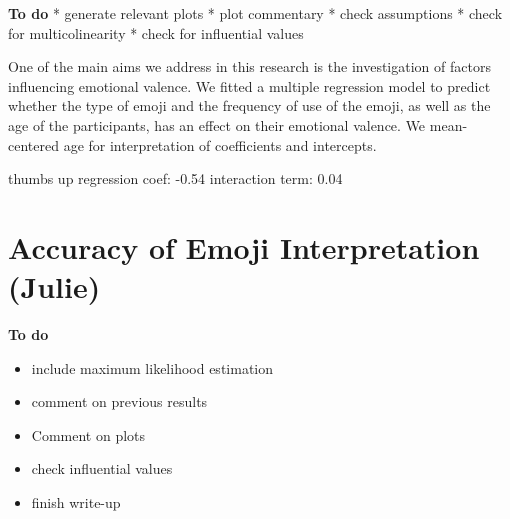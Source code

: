 \documentclass[
]{article}
\providecommand{\tightlist}{%
  \setlength{\itemsep}{0pt}\setlength{\parskip}{0pt}}
\begin{document}
\textbf{To do}
* generate relevant plots
* plot commentary
* check assumptions
* check for multicolinearity
* check for influential values

One of the main aims we address in this research is the investigation of factors influencing emotional valence. We fitted a multiple regression model to predict whether the type of emoji and the frequency of use of the emoji, as well as the age of the participants, has an effect on their emotional valence. We mean-centered age for interpretation of coefficients and intercepts.

thumbs up regression coef: -0.54
interaction term: 0.04

\hypertarget{accuracy-of-emoji-interpretation-julie}{%
\section{Accuracy of Emoji Interpretation (Julie)}\label{accuracy-of-emoji-interpretation-julie}}

\textbf{To do}

\begin{itemize}
\tightlist
\item
  include maximum likelihood estimation
\item
  comment on previous results
\item
  Comment on plots
\item
  check influential values
\item
  finish write-up
\end{itemize}
\end{document}
